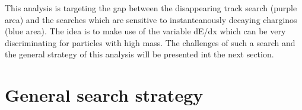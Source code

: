 This analysis is targeting the gap between the disappearing track search (purple area) and the searches which are sensitive to instanteanously decaying charginos (blue area). 
The idea is to make use of the variable dE/dx which can be very discriminating for particles with high mass.
The challenges of such a search and the general strategy of this analysis will be presented int the next section.

\section{General search strategy}
\label{sec:GeneralSearchStrategy}

